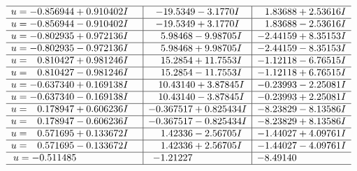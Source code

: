\documentclass[1p]{elsarticle_modified}
\theoremstyle{definition}
\begin{document}
$$\begin{array}{c|c|c}
 \hline 
\begin{aligned}
u &= -0.856944 + 0.910402 I\end{aligned}
 & -19.5349 - 3.1770 I & \phantom{-}1.83688 + 2.53616 I \\ \hline\begin{aligned}
u &= -0.856944 - 0.910402 I\end{aligned}
 & -19.5349 + 3.1770 I & \phantom{-}1.83688 - 2.53616 I \\ \hline\begin{aligned}
u &= -0.802935 + 0.972136 I\end{aligned}
 & \phantom{-}5.98468 - 9.98705 I & -2.44159 + 8.35153 I \\ \hline\begin{aligned}
u &= -0.802935 - 0.972136 I\end{aligned}
 & \phantom{-}5.98468 + 9.98705 I & -2.44159 - 8.35153 I \\ \hline\begin{aligned}
u &= \phantom{-}0.810427 + 0.981246 I\end{aligned}
 & \phantom{-}15.2854 + 11.7553 I & -1.12118 - 6.76515 I \\ \hline\begin{aligned}
u &= \phantom{-}0.810427 - 0.981246 I\end{aligned}
 & \phantom{-}15.2854 - 11.7553 I & -1.12118 + 6.76515 I \\ \hline\begin{aligned}
u &= -0.637340 + 0.169138 I\end{aligned}
 & \phantom{-}10.43140 + 3.87845 I & -0.23993 - 2.25081 I \\ \hline\begin{aligned}
u &= -0.637340 - 0.169138 I\end{aligned}
 & \phantom{-}10.43140 - 3.87845 I & -0.23993 + 2.25081 I \\ \hline\begin{aligned}
u &= \phantom{-}0.178947 + 0.606236 I\end{aligned}
 & -0.367517 + 0.825434 I & -8.23829 - 8.13586 I \\ \hline\begin{aligned}
u &= \phantom{-}0.178947 - 0.606236 I\end{aligned}
 & -0.367517 - 0.825434 I & -8.23829 + 8.13586 I \\ \hline\begin{aligned}
u &= \phantom{-}0.571695 + 0.133672 I\end{aligned}
 & \phantom{-}1.42336 - 2.56705 I & -1.44027 + 4.09761 I \\ \hline\begin{aligned}
u &= \phantom{-}0.571695 - 0.133672 I\end{aligned}
 & \phantom{-}1.42336 + 2.56705 I & -1.44027 - 4.09761 I \\ \hline\begin{aligned}
u &= -0.511485\phantom{ +0.000000I}\end{aligned}
 & -1.21227\phantom{ +0.000000I} & -8.49140\phantom{ +0.000000I}\\
 \hline 
 \end{array}$$\newpage
\end{document}
